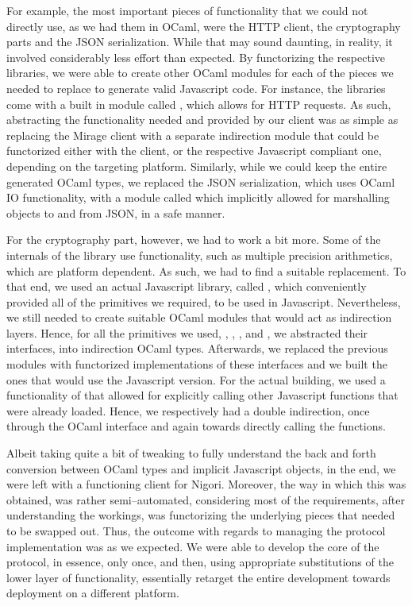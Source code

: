 For example, the most important pieces of functionality that we could not directly use, as we had them in OCaml, were the HTTP client, the cryptography parts and the JSON serialization.
While that may sound daunting, in reality, it involved considerably less effort than expected.
By functorizing the respective libraries, we were able to create other OCaml modules for each of the pieces we needed to replace to generate valid Javascript code.
For instance, the  libraries come with a built in module called , which allows for HTTP requests.
As such, abstracting the functionality needed and provided by our client was as simple as replacing the Mirage client with a separate indirection module that could be functorized either with the  client, or the respective Javascript compliant one, depending on the targeting platform.
Similarly, while we could keep the entire  generated OCaml types, we replaced the JSON serialization, which uses OCaml IO functionality, with a  module called  which implicitly allowed for marshalling objects to and from JSON, in a safe manner.

For the cryptography part, however, we had to work a bit more.
Some of the internals of the  library use functionality, such as multiple precision arithmetics, which are platform dependent.
As such, we had to find a suitable replacement.
To that end, we used an actual Javascript library, called  \cite{jscrypto}, which conveniently provided all of the primitives we required, to be used in Javascript.
Nevertheless, we still needed to create suitable OCaml modules that would act as indirection layers.
Hence, for all the primitives we used, , , ,  and , we abstracted their interfaces, into indirection OCaml types.
Afterwards, we replaced the previous modules with functorized implementations of these interfaces and we built the ones that would use the Javascript version.
For the actual building, we used a functionality of  that allowed for explicitly calling other Javascript functions that were already loaded.
Hence, we respectively had a double indirection, once through the OCaml interface and again towards directly calling the  functions.

Albeit taking quite a bit of tweaking to fully understand the back and forth conversion between OCaml types and implicit Javascript objects, in the end, we were left with a functioning client for Nigori.
Moreover, the way in which this was obtained, was rather semi--automated, considering most of the requirements, after understanding the workings, was functorizing the underlying pieces that needed to be swapped out.
Thus, the outcome with regards to managing the protocol implementation was as we expected.
We were able to develop the core of the protocol, in essence, only once, and then, using appropriate substitutions of the lower layer of functionality, essentially retarget the entire development towards deployment on a different platform.
